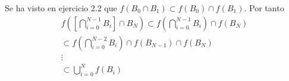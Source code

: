 \documentclass{article}
\begin{document}
\newline
Se ha visto en ejercicio 2.2 que \(f(B_0\cap B_1) \subset f(B_0)\cap f(B_1)\). Por tanto \newline
\begin{equation}
\begin{aligned}
f\left( \left[\bigcap\limits_{i=0}^{N-1}B_i\right] \cap B_N \right) \subset f\left(\bigcap\limits_{i=0}^{N-1} B_i\right)\cap f( B_N ) \\ 
\subset f\left(\bigcap\limits_{i=0}^{N-2} B_i\right)\cap f( B_{N-1})\cap f( B_N )
\\ \vdots \\
\subset \bigcup \limits_{i=0}^{N}f\left( B_i \right)
\end{aligned}
\end{equation}
\newline
%
%
\end{document}
